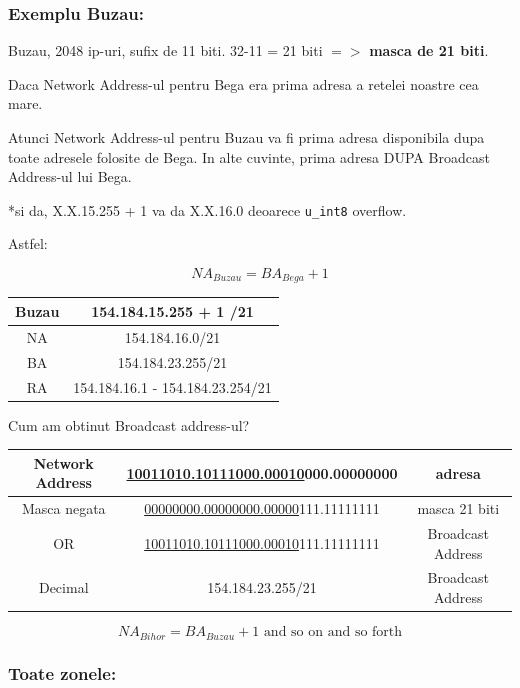 \documentclass{article}
\begin{document}
\subsubsection{Exemplu Buzau:}
    
Buzau, 2048 ip-uri, sufix de 11 biti. 32-11 = 21 biti $=>$ \textbf{masca de 21 biti}.

Daca Network Address-ul pentru Bega era prima adresa a retelei noastre cea mare.

Atunci Network Address-ul pentru Buzau va fi prima adresa disponibila dupa toate adresele folosite de Bega.
In alte cuvinte, prima adresa DUPA Broadcast Address-ul lui Bega. 

*si da, X.X.15.255 + 1 va da X.X.16.0 deoarece \texttt{u\_int8} overflow.

Astfel:

\begin{center}
    $$NA_{Buzau} = BA_{Bega}+1$$
\end{center}


\begin{center}
    \begin{tabular}{|c|c|}
        \hline Buzau & 154.184.15.255 + 1 /21\\
       \hline  NA & 154.184.16.0/21  \\
       \hline BA & 154.184.23.255/21\\
       \hline RA &  154.184.16.1 - 154.184.23.254/21 \\
       \hline
    \end{tabular}
\end{center}
Cum am obtinut Broadcast address-ul?

\begin{center}
   \begin{tabular}{|c|c|c|}
   \hline
      Network Address &  \underline{10011010.10111000.00010}000.00000000 & adresa  \\
    \hline
      Masca negata &  \underline{00000000.00000000.00000}111.11111111 & masca 21 biti \\
    \hline \hline
       OR & \underline{10011010.10111000.00010}111.11111111 & Broadcast Address\\
    \hline
        Decimal & 154.184.23.255/21 &  Broadcast Address\\
    \hline
    \end{tabular}
\end{center}
    $$NA_{Bihor} = BA_{Buzau}+1 \text{ and so on and so forth}$$

\subsubsection{Toate zonele:}
\end{document}
